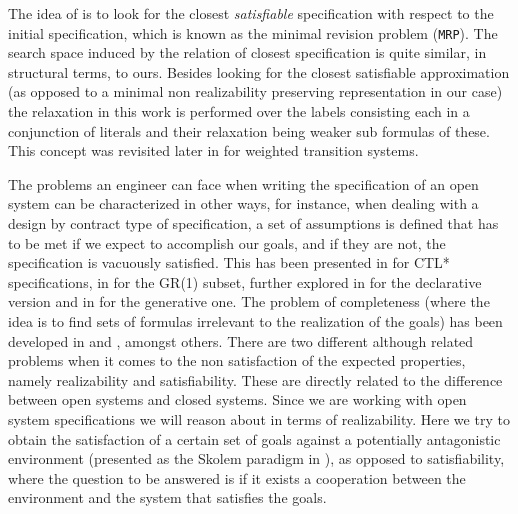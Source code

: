 The idea of \cite{DBLP:conf/icra/KimFS12} is to look for the closest \textit{satisfiable} specification with respect to the initial specification, which is known as the minimal revision problem (\texttt{MRP}).  The search space induced by the relation of closest specification is quite similar, in structural terms, to ours. Besides looking for the closest satisfiable approximation (as opposed to a minimal non realizability preserving representation in our case) the relaxation in this work is performed over the labels consisting each in a conjunction of literals and their relaxation being weaker sub formulas of these.  This concept was revisited later in \cite{DBLP:conf/icra/KimF13} for weighted transition systems.



The problems an engineer can face when writing the specification
of an open system can be characterized in other ways, for instance, 
when dealing with a design by contract type of specification, a set of assumptions is defined that has to be met
if we expect to accomplish our goals, and
if they are not, the specification is vacuously satisfied.
This has been presented in \cite{kupferman2003vacuity}
for CTL* specifications, in \cite{DBLP:conf/hvc/KleinP10} for the
GR(1)\cite{DBLP:conf/vmcai/PitermanPS06} subset, further explored in \cite{DBLP:conf/sigsoft/MaozR16}
for the declarative version and in \cite{DBLP:phd/ethos/DIppolito13}
for the generative one.  
The problem of completeness (where the idea is to find sets of formulas
irrelevant to the realization of the goals) has been
developed in \cite{chockler2001practical} and \cite{chockler2001coverage},
amongst others.
There are two different although related problems when it comes to 
the non satisfaction of the expected properties, namely
 realizability and satisfiability.
 These are directly related to the difference
between open systems and closed systems.  
Since 
we are working with open system specifications we will reason about in terms of
realizability.  Here we try to obtain the 
satisfaction of a certain set of goals against a
potentially antagonistic environment (presented as the Skolem paradigm in 
\cite{DBLP:conf/popl/PnueliR89}), as opposed to satisfiability, where
the question to be answered is if it exists a cooperation between 
the environment and the system that satisfies the goals.


